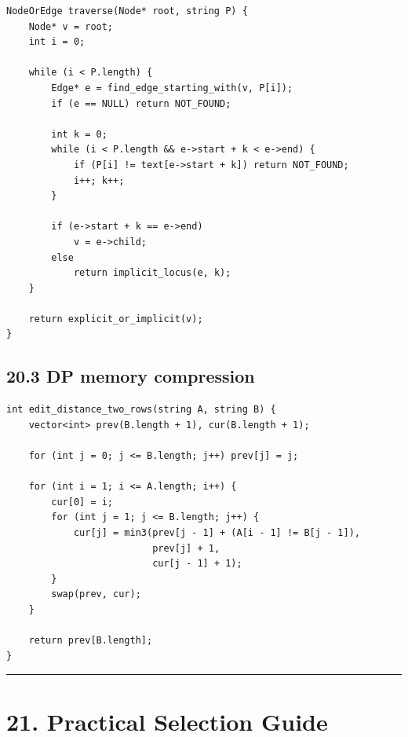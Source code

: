 \documentclass[11pt]{article}
\begin{document}
\begin{verbatim}
NodeOrEdge traverse(Node* root, string P) {
    Node* v = root;
    int i = 0;

    while (i < P.length) {
        Edge* e = find_edge_starting_with(v, P[i]);
        if (e == NULL) return NOT_FOUND;

        int k = 0;
        while (i < P.length && e->start + k < e->end) {
            if (P[i] != text[e->start + k]) return NOT_FOUND;
            i++; k++;
        }

        if (e->start + k == e->end)
            v = e->child;
        else
            return implicit_locus(e, k);
    }

    return explicit_or_implicit(v);
}
\end{verbatim}

\subsection{20.3 DP memory compression}\label{dp-memory-compression}

\begin{verbatim}
int edit_distance_two_rows(string A, string B) {
    vector<int> prev(B.length + 1), cur(B.length + 1);

    for (int j = 0; j <= B.length; j++) prev[j] = j;

    for (int i = 1; i <= A.length; i++) {
        cur[0] = i;
        for (int j = 1; j <= B.length; j++) {
            cur[j] = min3(prev[j - 1] + (A[i - 1] != B[j - 1]),
                          prev[j] + 1,
                          cur[j - 1] + 1);
        }
        swap(prev, cur);
    }

    return prev[B.length];
}
\end{verbatim}

\begin{center}\rule{0.5\linewidth}{0.5pt}\end{center}

\section{21. Practical Selection Guide}\label{practical-selection-guide}
\end{document}
